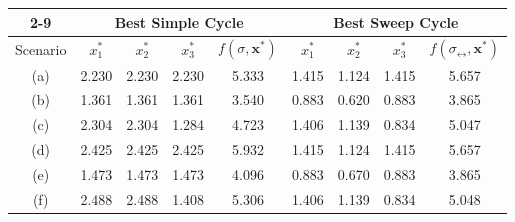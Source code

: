 \documentclass[11pt,a4paper]{article}
\begin{document}
\begin{table}[H]
\centering
\begin{tabular}{c|cccc|cccc|}
\cline{2-9}
                           & \multicolumn{4}{c|}{Best Simple Cycle}                                                                             & \multicolumn{4}{c|}{Best Sweep Cycle}                                                                                              \\ \hline
\multicolumn{1}{|c|}{Scenario} & \multicolumn{1}{c|}{$x_1^*$} & \multicolumn{1}{c|}{$x_2^*$} & \multicolumn{1}{c|}{$x_3^*$} & $f(\sigma,\textbf{x}^*)$ & \multicolumn{1}{c|}{$x_1^*$} & \multicolumn{1}{c|}{$x_2^*$} & \multicolumn{1}{c|}{$x_3^*$} & $f(\sigma_\leftrightarrow,\textbf{x}^*)$ \\ \hline
\multicolumn{1}{|c|}{(a)}  & \multicolumn{1}{c|}{2.230} & \multicolumn{1}{c|}{2.230} & \multicolumn{1}{c|}{2.230} & 5.333                  & \multicolumn{1}{c|}{1.415} & \multicolumn{1}{c|}{1.124} & \multicolumn{1}{c|}{1.415} & 5.657                                  \\ \hline
\multicolumn{1}{|c|}{(b)}  & \multicolumn{1}{c|}{1.361} & \multicolumn{1}{c|}{1.361} & \multicolumn{1}{c|}{1.361} & 3.540                  & \multicolumn{1}{c|}{0.883} & \multicolumn{1}{c|}{0.620} & \multicolumn{1}{c|}{0.883} & 3.865                                  \\ \hline
\multicolumn{1}{|c|}{(c)}  & \multicolumn{1}{c|}{2.304} & \multicolumn{1}{c|}{2.304} & \multicolumn{1}{c|}{1.284} & 4.723                  & \multicolumn{1}{c|}{1.406} & \multicolumn{1}{c|}{1.139} & \multicolumn{1}{c|}{0.834} & 5.047                                  \\ \hline
\multicolumn{1}{|c|}{(d)}  & \multicolumn{1}{c|}{2.425} & \multicolumn{1}{c|}{2.425} & \multicolumn{1}{c|}{2.425} & 5.932                  & \multicolumn{1}{c|}{1.415} & \multicolumn{1}{c|}{1.124} & \multicolumn{1}{c|}{1.415} & 5.657                                  \\ \hline
\multicolumn{1}{|c|}{(e)}  & \multicolumn{1}{c|}{1.473} & \multicolumn{1}{c|}{1.473} & \multicolumn{1}{c|}{1.473} & 4.096                  & \multicolumn{1}{c|}{0.883} & \multicolumn{1}{c|}{0.670} & \multicolumn{1}{c|}{0.883} & 3.865                                  \\ \hline
\multicolumn{1}{|c|}{(f)}  & \multicolumn{1}{c|}{2.488} & \multicolumn{1}{c|}{2.488} & \multicolumn{1}{c|}{1.408} & 5.306                  & \multicolumn{1}{c|}{1.406} & \multicolumn{1}{c|}{1.139} & \multicolumn{1}{c|}{0.834} & 5.048                                  \\ \hline

\end{tabular}
\end{table}
\end{document}
